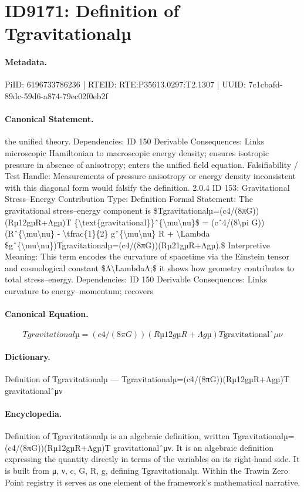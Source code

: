 \section*{ID9171: Definition of Tgravitationalµ}
\paragraph{Metadata.}
PiID: 6196733786236 | RTEID: RTE:P35613.0297:T2.1307 | UUID: 7c1cbafd-89dc-59d6-a874-79ec02f0eb2f

\paragraph{Canonical Statement.}
the unified theory. Dependencies: ID 150 Derivable Consequences: Links microscopic Hamiltonian to macroscopic energy density; ensures isotropic pressure in absence of anisotropy; enters the unified field equation. Falsifiability / Test Handle: Measurements of pressure anisotropy or energy density inconsistent with this diagonal form would falsify the definition. 2.0.4 ID 153: Gravitational Stress–Energy Contribution Type: Definition Formal Statement: The gravitational stress–energy component is \$Tgravitationalµ=(c4/(8πG))(Rµ12gµR+Λgµ)T \{\textbackslash{}text\{gravitational\}\}ˆ\{\textbackslash{}mu\textbackslash{}nu\}\$ = (cˆ4/(8\textbackslash{}pi G))(Rˆ\{\textbackslash{}mu\textbackslash{}nu\} - \textbackslash{}tfrac\{1\}\{2\} gˆ\{\textbackslash{}mu\textbackslash{}nu\} R + \textbackslash{}Lambda \$gˆ\{\textbackslash{}mu\textbackslash{}nu\})Tgravitationalµ=(c4/(8πG))(Rµ21gµR+Λgµ).\$ Interpretive Meaning: This term encodes the curvature of spacetime via the Einstein tensor and cosmological constant \$Λ\textbackslash{}LambdaΛ;\$ it shows how geometry contributes to total stress–energy. Dependencies: ID 150 Derivable Consequences: Links curvature to energy–momentum; recovers

\paragraph{Canonical Equation.}
\[
Tgravitationalµ=(c4/(8πG))(Rµ12gµR+Λgµ)T {\text{gravitational}}ˆ{\mu\nu}
\]

\paragraph{Dictionary.}
Definition of Tgravitationalµ — Tgravitationalµ=(c4/(8πG))(Rµ12gµR+Λgµ)T gravitationalˆμν

\paragraph{Encyclopedia.}
Definition of Tgravitationalµ is an algebraic definition, written Tgravitationalµ=(c4/(8πG))(Rµ12gµR+Λgµ)T gravitationalˆμν. It is an algebraic definition expressing the quantity directly in terms of the variables on its right-hand side. It is built from μ, ν, c, G, R, g, defining Tgravitationalµ. Within the Trawin Zero Point registry it serves as one element of the framework's mathematical narrative.
